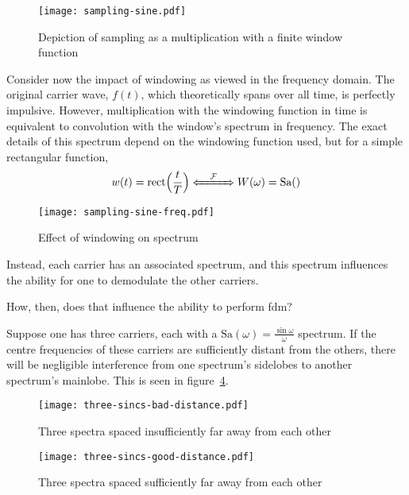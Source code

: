 \documentclass[class=report,11pt,crop=false]{standalone}
\begin{document}
\begin{figure}
    \centering
    \texttt{[image: sampling-sine.pdf]}
    \caption{Depiction of sampling as a multiplication with a finite window function}
    \label{fig:sampling-sine}
\end{figure}

Consider now the impact of windowing as viewed in the frequency domain. The original carrier wave, \(f(t)\), which theoretically spans over all time, is perfectly impulsive. However, multiplication with the windowing function in time is equivalent to convolution with the window's spectrum in frequency. The exact details of this spectrum depend on the windowing function used, but for a simple rectangular function,
\begin{equation}
    w(t) = \textrm{rect}\Big(\frac{t}{T}\Big) \xLeftrightarrow{\quad\mathcal{F}\quad} W(\omega) = \text{Sa}()
\end{equation}


\begin{figure}
    \centering
    \texttt{[image: sampling-sine-freq.pdf]}
    \caption{Effect of windowing on spectrum}
    \label{fig:sampling-sine-freq}
\end{figure}

Instead, each carrier has an associated spectrum, and this spectrum influences the ability for one to demodulate the other carriers.

How, then, does that influence the ability to perform \gls{fdm}?

Suppose one has three carriers, each with a \(\textrm{Sa}(\omega) = \frac{\sin \omega}{\omega}\) spectrum. If the centre frequencies of these carriers are sufficiently distant from the others, there will be negligible interference from one spectrum's sidelobes to another spectrum's mainlobe. This is seen in figure~\ref{fig:three-sincs-good-distance}.


\begin{figure}
    \centering
    \texttt{[image: three-sincs-bad-distance.pdf]}
    \caption{Three spectra spaced insufficiently far away from each other}
    \label{fig:three-sincs-bad-distance}
\end{figure}

\begin{figure}
    \centering
    \texttt{[image: three-sincs-good-distance.pdf]}
    \caption{Three spectra spaced sufficiently far away from each other}
    \label{fig:three-sincs-good-distance}
\end{figure}
\end{document}
